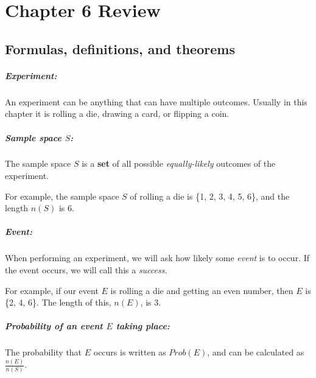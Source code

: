 \documentclass[a4paper,12pt]{book}
\title{}
\author{Rachel Morris}
\date{\today}
\newcommand{\laChapter}{Chapter 6 Review\ }
\begin{document}
    \chapter*{\laChapter}

        \section*{Formulas, definitions, and theorems}

        \paragraph{Experiment:}
            An experiment can be anything that can have multiple outcomes.
            Usually in this chapter it is rolling a die, drawing a card,
            or flipping a coin.
        
        \paragraph{Sample space $S$:}
            The sample space $S$ is a \textbf{set} of all possible
            \textit{equally-likely} outcomes of the experiment.
            
            For example, the sample space $S$ of rolling a die is
            \{1, 2, 3, 4, 5, 6\}, and the length $n(S)$ is 6.
        
        \paragraph{Event:}
            When performing an experiment, we will ask how likely some
            \textit{event} is to occur. If the event occurs, we will
            call this a \textit{success}.
            
            For example, if our event $E$ is rolling a die and getting
            an even number, then $E$ is \{2, 4, 6\}. The length of
            this, $n(E)$, is 3.
        
        \paragraph{Probability of an event $E$ taking place:}
            The probability that $E$ occurs is written as $Prob(E)$,
            and can be calculated as $\frac{n(E)}{n(S)}$.
            
\end{document}
